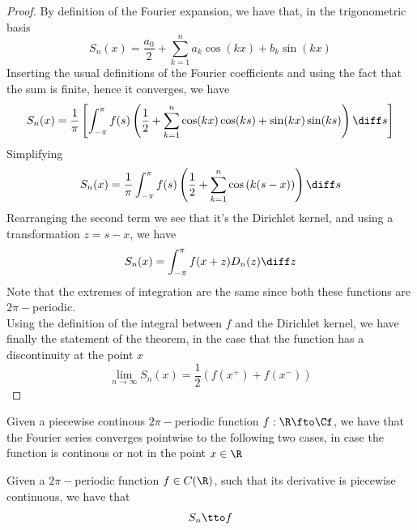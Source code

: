 \documentclass[../mmf.tex]{subfiles}
\begin{document}
\begin{proof}
	By definition of the Fourier expansion, we have that, in the trigonometric basis
	\begin{equation*}
		S_n(x)=\frac{a_0}{2}+\sum_{k=1}^{n}a_k\cos(kx)+b_k\sin(kx)
	\end{equation*}
	Inserting the usual definitions of the Fourier coefficients and using the fact that the sum is finite, hence it converges, we have
	\begin{equation*}
		S_n(x)=\frac{1}{\pi}\left[ \int_{-\pi}^{\pi}f(s)\left( \frac{1}{2}+\sum_{k=1}^{n}\cos(kx)\cos(ks)+\sin(kx)\sin(ks) \right)\diff s \right]
	\end{equation*}
	Simplifying
	\begin{equation*}
		S_n(x)=\frac{1}{\pi}\int_{-\pi}^{\pi}f(s)\left( \frac{1}{2}+\sum_{k=1}^{n}\cos\left( k(s-x) \right) \right)\diff s
	\end{equation*}
	Rearranging the second term we see that it's the Dirichlet kernel, and using a transformation $z=s-x$, we have
	\begin{equation*}
		S_n(x)=\int_{-\pi}^{\pi}f(x+z)D_n(z)\diff z
	\end{equation*}
	Note that the extremes of integration are the same since both these functions are $2\pi-$periodic.\\
	Using the definition of the integral between $f$ and the Dirichlet kernel, we have finally the statement of the theorem, in the case that the function has a discontinuity at the point $x$
	\begin{equation*}
		\lim_{n\to\infty}S_n(x)=\frac{1}{2}\left( f(x^+)+f(x^-) \right)
	\end{equation*}
\end{proof}
\begin{thm}
	Given a piecewise continous $2\pi-$periodic function $f:\R\fto\Cf$, we have that the Fourier series converges pointwise to the following two cases, in case the function is continous or not in the point $x\in\R$
\end{thm}
\begin{thm}
	Given a $2\pi-$periodic function $f\in C(\R)$, such that its derivative is piecewise continuous, we have that
	\begin{equation*}
		S_n\tto f
	\end{equation*}
\end{thm}
\end{document}
